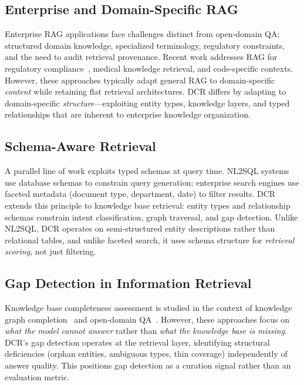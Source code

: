 \documentclass[11pt,a4paper]{article}
\begin{document}
\subsection{Enterprise and Domain-Specific RAG}

Enterprise RAG applications face challenges distinct from open-domain QA: structured domain knowledge, specialized terminology, regulatory constraints, and the need to audit retrieval provenance. Recent work addresses RAG for regulatory compliance~\citep{sarmah2024hybridrag}, medical knowledge retrieval, and code-specific contexts. However, these approaches typically adapt general RAG to domain-specific \emph{content} while retaining flat retrieval architectures. DCR differs by adapting to domain-specific \emph{structure}---exploiting entity types, knowledge layers, and typed relationships that are inherent to enterprise knowledge organization.

\subsection{Schema-Aware Retrieval}

A parallel line of work exploits typed schemas at query time. NL2SQL systems~\citep{rajkumar2022nl2sql} use database schemas to constrain query generation; enterprise search engines use faceted metadata (document type, department, date) to filter results. DCR extends this principle to knowledge base retrieval: entity types and relationship schemas constrain intent classification, graph traversal, and gap detection. Unlike NL2SQL, DCR operates on semi-structured entity descriptions rather than relational tables, and unlike faceted search, it uses schema structure for \emph{retrieval scoring}, not just filtering.

\subsection{Gap Detection in Information Retrieval}

Knowledge base completeness assessment is studied in the context of knowledge graph completion~\citep{bordes2013transe} and open-domain QA~\citep{rajpurkar2018squad}. However, these approaches focus on \emph{what the model cannot answer} rather than \emph{what the knowledge base is missing}. DCR's gap detection operates at the retrieval layer, identifying structural deficiencies (orphan entities, ambiguous types, thin coverage) independently of answer quality. This positions gap detection as a curation signal rather than an evaluation metric.
\end{document}
